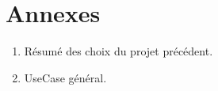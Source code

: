 \documentclass{article}
\begin{document}
\newpage
\section{Annexes}
\begin{enumerate}
  \item Résumé des choix du projet précédent.
  \item UseCase général.
\end{enumerate}

\newpage
\begingroup
  \renewcommand{\section}[2]{\Large\textbf{Références}\normalsize}
  
  
  \nocite{*}
\endgroup
\end{document}

